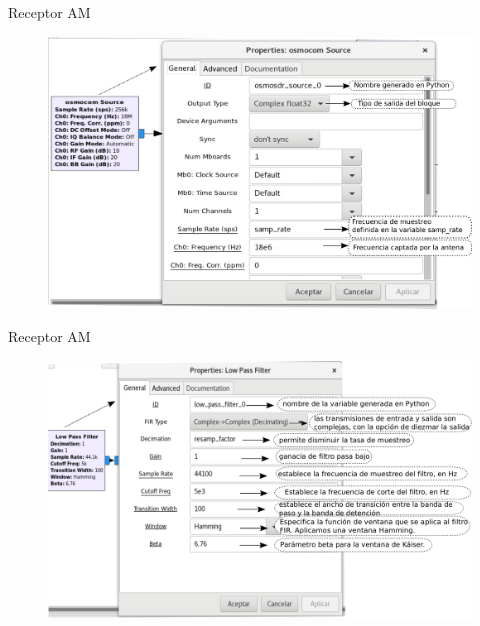 \begin{frame}{Receptor AM}

\begin{figure}[H]
\centering
\vspace{-3mm}
\includegraphics[width=\textwidth]{parte3/lab16/pdf/lab16_3.pdf}
\end{figure}

\end{frame}

\begin{frame}{Receptor AM}

\begin{figure}[H]
\centering
\vspace{-3mm}
\includegraphics[width=\textwidth]{parte3/lab16/pdf/lab16_4.pdf}

\end{figure}

\end{frame}

